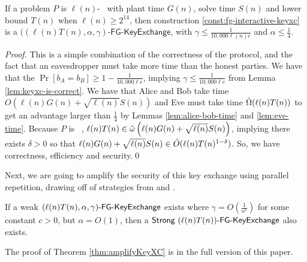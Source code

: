 \begin{theorem}\label{thm:fg-pkc}
	If a problem $P$ is $\ell(n)$-\keyER~ with plant time $G(n)$, solve time $S(n)$ and lower bound $T(n)$ when $\ell(n)\ge2^{14}$,
	then construction \ref{const:fg-interactive-keyxc} is a $((\ell(n)T(n), \alpha, \gamma)$-$\mathsf{FG}\mbox{-}\mathsf{KeyExchange}$, with $\gamma \le \frac{1}{10,000 \ell(n)e}$ and $\alpha \le \frac 1 4$.
	\label{thm:ATTimpPKE}
\end{theorem}
\begin{proof}
	This is a simple combination of the correctness of the protocol, and the fact that an eavesdropper must take more time than the honest parties. We have that the $\Pr[b_A = b_B] \ge 1 - \frac{1}{10,000 \ell e}$, implying $\gamma \le \frac{1}{10,000 \ell e}$ from Lemma \ref{lem:keyxc-is-correct}. We have that Alice and Bob take time $O(\ell(n) G(n) + \sqrt{\ell(n)}S(n))$ and Eve must take time $\~\Omega(\ell(n)T(n))$ to get an advantage larger than $\frac 1 4$ by Lemmas \ref{lem:alice-bob-time} and \ref{lem:eve-time}. Because $P$ is \keyER~, $\ell(n)T(n) \in \~\omega\left(\ell(n)G(n) + \sqrt{\ell(n)}S(n)\right)$, implying there exists $\delta > 0$ so that $\ell(n)G(n) + \sqrt{\ell(n)}S(n) \in \~O(\ell(n)T(n)^{1 - \delta})$. So, we have correctness, efficiency and security.\qed
\end{proof}

Next, we are going to amplify the security of this key exchange using parallel repetition, drawing off of strategies from \cite{DNR04} and \cite{BIN97}.

\begin{theorem}\label{thm:amplifyKeyXC}
	If a weak $\fgkeyxc{\ell(n)T(n)}{\alpha}{\gamma}$ exists where $\gamma = O\left(\frac{1}{n^c}\right)$ for some constant $c>0$, but $\alpha = O(1)$, then a $\strongfgkeyxc{\ell(n)T(n)}$ also exists.
\end{theorem}
The proof of Theorem \ref{thm:amplifyKeyXC} is in the full version of this paper. 
	
